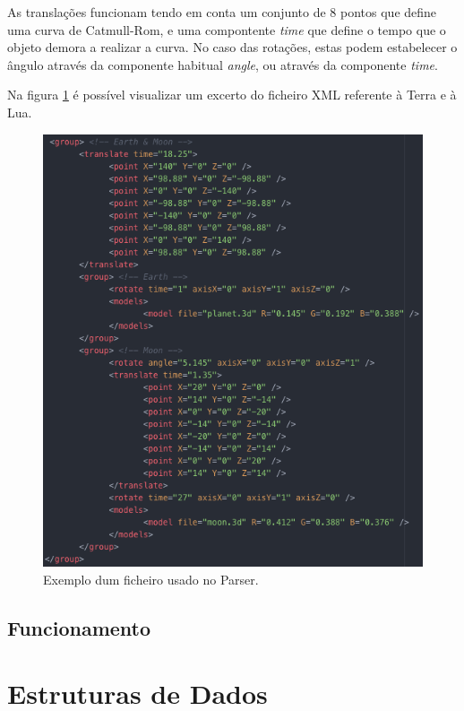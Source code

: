 \documentclass[a4paper]{article}
\begin{document}
As translações funcionam tendo em conta um conjunto de 8 pontos que define uma curva de Catmull-Rom, e uma compontente \textit{time} que define o tempo que o objeto demora a realizar a curva. No caso das rotações, estas podem estabelecer o ângulo através da componente habitual \textit{angle}, ou através da componente \textit{time}.

Na figura \ref{img:ficheiro_parser} é possível visualizar um excerto do ficheiro XML referente à Terra e à Lua.

\begin{figure}[H]
\centering
\includegraphics[scale=0.50]{ficheiro_parser.png}
\caption{Exemplo dum ficheiro usado no Parser.}
\label{img:ficheiro_parser}
\end{figure}

\subsection{Funcionamento}
\label{sec:funcionamento}



\section{Estruturas de Dados}
\label{sec:estruturasdados}
\end{document}
